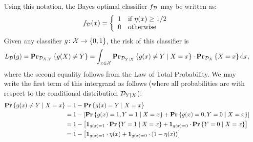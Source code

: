 Using this notation, the Bayes optimal classifier $f_{\mathcal{D}}$ may be written as:
\[
    f_{\mathcal{D}} (x) = \left \{ \begin{array}{ll}
                                1 & \text{if } \eta(x) \geq 1/2 \\
                                0 & \text{otherwise}
                         \end{array} \right .
\]
Given any classifier $g \colon \mathcal{X} \rightarrow \{0, 1\}$, the risk of this
classifier is
\begin{equation}
\label{ex3.7:loss}
    L_{\mathcal{D}} (g) = \mathbf{Pr}_{\mathcal{D}_{X, Y}} \left \{ g(X) \neq Y \right \} = \int_{x \in \mathcal{X}}
 \mathbf{Pr}_{\mathcal{D}_{Y \mid X}} \left \{ g(x) \neq Y \mid X = x \right \} \cdot \mathbf{Pr}_{\mathcal{D}_{X}} \left \{ X = x \right \} \text{d} x,
\end{equation}
where the second equality follows from the Law of Total Probability.
We may write the first term of this intergrand as follows (where all probabilities
are with respect to the conditional distribution $\mathcal{D}_{Y \mid X}$):
\begin{align*}
    \mathbf{Pr} \left \{ g(x) \neq Y \mid X = x \right \} & =  1 - \mathbf{Pr} \left \{ g(x) = Y \mid X = x \right \} \\
    & = 1 - \left [ \mathbf{Pr} \left \{ g(x) = 1, Y = 1 \mid X = x \right \} + \mathbf{Pr} \left \{ g(x) = 0, Y = 0 \mid X = x \right \} \right ] \\
    & = 1 - \left [ \mathbf{1}_{g(x) = 1} \cdot \mathbf{Pr} \left \{ Y = 1 \mid X = x \right \}  +
                  \mathbf{1}_{g(x) = 0} \cdot \mathbf{Pr} \left \{ Y = 0 \mid X = x \right \} \right ] \\
    & = 1 - \left [ \mathbf{1}_{g(x) = 1} \cdot \eta (x)  +
                  \mathbf{1}_{g(x) = 0} \cdot (1 - \eta (x)) \right ] \\
\end{align*}

